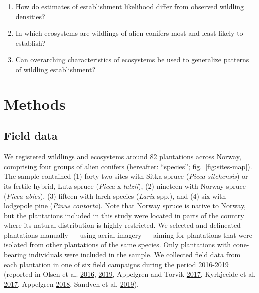 \documentclass[
]{article}
\providecommand{\tightlist}{%
  \setlength{\itemsep}{0pt}\setlength{\parskip}{0pt}}
\begin{document}
\begin{enumerate}
\def\labelenumi{\arabic{enumi}.}
\tightlist
\item
  How do estimates of establishment likelihood differ from observed wildling densities?
\item
  In which ecosystems are wildlings of alien conifers most and least likely to establish?
\item
  Can overarching characteristics of ecosystems be used to generalize patterns of wildling establishment?
\end{enumerate}

\hypertarget{methods}{%
\section{Methods}\label{methods}}

\hypertarget{field-data}{%
\subsection{Field data}\label{field-data}}

We registered wildlings and ecosystems around 82 plantations across Norway, comprising four groups of alien conifers (hereafter: ``species''; fig.~\ref{fig:sites-map}).
The sample contained (1) forty-two sites with Sitka spruce (\emph{Picea sitchensis}) or its fertile hybrid, Lutz spruce (\emph{Picea} x \emph{lutzii}), (2) nineteen with Norway spruce (\emph{Picea abies}), (3) fifteen with larch species (\emph{Larix} spp.), and (4) six with lodgepole pine (\emph{Pinus contorta}).
Note that Norway spruce is native to Norway, but the plantations included in this study were located in parts of the country where its natural distribution is highly restricted.
We selected and delineated plantations manually --- using aerial imagery --- aiming for plantations that were isolated from other plantations of the same species.
Only plantations with cone-bearing individuals were included in the sample.
We collected field data from each plantation in one of six field campaigns during the period 2016-2019 (reported in Olsen et al. \protect\hyperlink{ref-olsenKartleggingAvKortdistansespredning2016}{2016}, \protect\hyperlink{ref-olsenKartleggingAvKortdistansespredning2019}{2019}, Appelgren and Torvik \protect\hyperlink{ref-appelgrenKartleggingAvKortdistansespredning2017}{2017}, Kyrkjeeide et al. \protect\hyperlink{ref-kyrkjeeideKartleggingAvKortdistansespredning2017}{2017}, Appelgren \protect\hyperlink{ref-appelgrenKartleggingAvKortdistansespredning2018}{2018}, Sandven et al. \protect\hyperlink{ref-sandvenKartleggingAvKortdistansespredning2019}{2019}).
\end{document}
